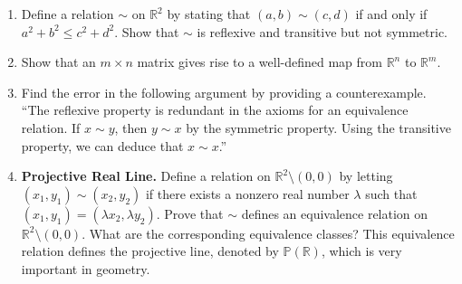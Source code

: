 {\begin{enumerate}
\begin{multicols}{2}
\begin{enumerate}
\item
$x \sim y$ in ${\mathbb R}$ if $x \geq y$
 
\item
$m \sim n$ in ${\mathbb Z}$ if $mn > 0$
 
\item
$x \sim y$ in ${\mathbb R}$ if $|x - y| \leq 4$
 
\item
$m \sim n$ in ${\mathbb Z}$ if $m \equiv n \pmod{6}$
 
\end{enumerate}
\end{multicols}
 
 
\item
Define a relation $\sim$ on ${\mathbb R}^2$ by stating that $(a, b) \sim (c, d)$ if and only if $a^2 + b^2 \leq c^2 + d^2$. Show that $\sim$ is reflexive and transitive but not symmetric.
 
\item
Show that an $m \times n$ matrix gives rise to a well-defined  map from ${\mathbb R}^n$ to ${\mathbb R}^m$. 
 
\item
Find the error in the following argument by providing a counterexample. ``The reflexive property is redundant in the axioms for an equivalence relation.  If $x \sim y$, then $y \sim x$ by the symmetric property.  Using the transitive property, we can deduce that $x \sim x$.'' 
 
\item
\textbf{Projective Real Line.}
Define a relation on ${\mathbb R}^2 \setminus  (0,0)$ by letting $(x_1, y_1) \sim (x_2, y_2)$ if there exists a nonzero real number $\lambda$ such that $(x_1, y_1)  = ( \lambda x_2, \lambda y_2)$.  Prove that $\sim$ defines an equivalence relation on ${\mathbb R}^2 \setminus (0,0)$.  What are the corresponding  equivalence classes?  This equivalence relation defines the projective line, denoted by  ${\mathbb P}({\mathbb R} )$, which is very important in geometry.
 
\end{enumerate}
}
 
